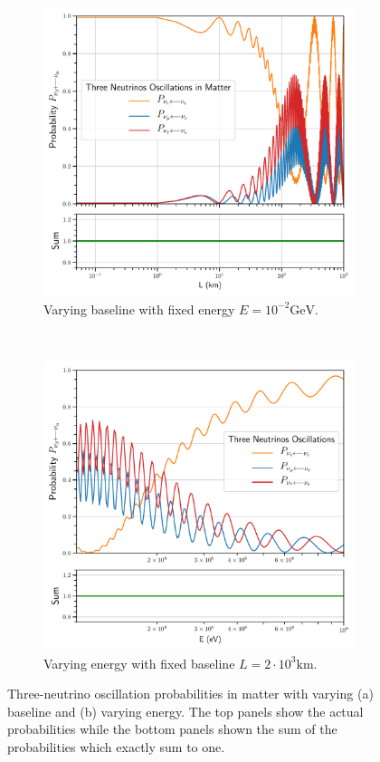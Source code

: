 \documentclass[twocolumn,secnumarabic,amssymb, nobibnotes, aps, prd,10pt]{revtex4-1}
\begin{document}
\begin{figure}
\captionsetup[subfigure]{aboveskip=-1.5pt,belowskip=-1.5pt} 
\begin{subfigure}{1.05\linewidth}
\includegraphics[width=\linewidth]{Osc3MatterBaseline.pdf}
\caption{Varying baseline with fixed energy $E=10^{-2} \mathrm{GeV}$.} 
\end{subfigure} 
\\
\begin{subfigure}{1.05\linewidth}
\includegraphics[width=\linewidth]{Osc3MatterEnergy.pdf}
\caption{Varying energy with fixed baseline $L=2 \cdot 10^3 \mathrm{km}$.} 
\label{fig:matter} 
\end{subfigure}
\caption{Three-neutrino oscillation probabilities in matter with varying (a) baseline
and (b) varying energy. The top panels show the actual probabilities while the bottom
panels shown the sum of the probabilities which exactly sum to one.}
\end{figure}
\end{document}
